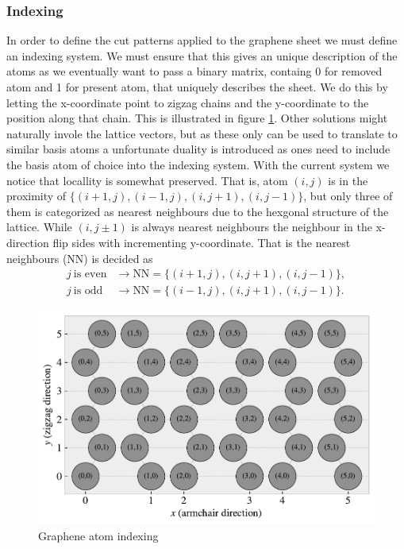 \subsubsection{Indexing}

In order to define the cut patterns applied to the graphene sheet we must define
an indexing system. We must ensure that this gives an unique description of the
atoms as we eventually want to pass a binary matrix, containg 0 for removed atom
and 1 for present atom, that uniquely describes the sheet. We do this by letting
the x-coordinate point to zigzag chains and the y-coordinate to the position
along that chain. This is illustrated in figure \ref{fig:atom_indexing}. Other
solutions might naturally invole the lattice vectors, but as these only can be
used to translate to similar basis atoms a unfortunate duality is introduced as
ones need to include the basis atom of choice into the indexing system. With the
current system we notice that locallity is somewhat preserved. That is, atom
$(i, j)$ is in the proximity of $\{(i+1, j), (i-1, j), (i, j+1), (i, j-1)\}$,
but only three of them is categorized as nearest neighbours due to the hexgonal
structure of the lattice. While $(i, j\pm 1)$ is always nearest neighbours the
neighbour in the x-direction flip sides with incrementing y-coordinate. That is
the nearest neighbours (NN) is decided as
\begin{align*}
  j \ \text{is even} &\rightarrow \text{NN} = \{(i+1, j), (i, j+1), (i, j-1)\}, \\
  j \ \text{is odd} &\rightarrow \text{NN} = \{(i-1, j), (i, j+1), (i, j-1)\}.
\end{align*}

\begin{figure}[H]
  \centering
  \includegraphics[width=0.7\linewidth]{figures/atom_indexing.pdf}
  \caption{Graphene atom indexing}
  \label{fig:atom_indexing}
\end{figure}

